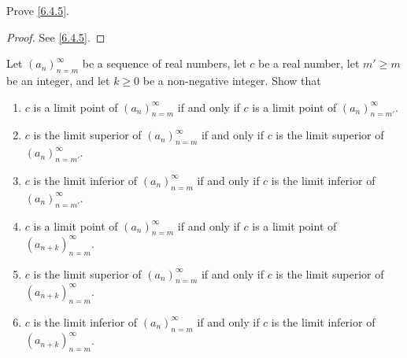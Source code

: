 \exercisesection

\begin{ex}\label{ex:6.4.1}
  Prove \cref{6.4.5}.
\end{ex}

\begin{proof}
  See \cref{6.4.5}.
\end{proof}

\begin{ex}\label{ex:6.4.2}
  Let \((a_n)_{n = m}^\infty\) be a sequence of real numbers, let \(c\) be a real number, let \(m' \geq m\) be an integer, and let \(k \geq 0\) be a non-negative integer.
  Show that
  \begin{enumerate}
    \item \(c\) is a limit point of \((a_n)_{n = m}^\infty\) if and only if \(c\) is a limit point of \((a_n)_{n = m'}^\infty\).
    \item \(c\) is the limit superior of \((a_n)_{n = m}^\infty\) if and only if \(c\) is the limit superior of \((a_n)_{n = m'}^\infty\).
    \item \(c\) is the limit inferior of \((a_n)_{n = m}^\infty\) if and only if \(c\) is the limit inferior of \((a_n)_{n = m'}^\infty\).
    \item \(c\) is a limit point of \((a_n)_{n = m}^\infty\) if and only if \(c\) is a limit point of \((a_{n + k})_{n = m}^\infty\).
    \item \(c\) is the limit superior of \((a_n)_{n = m}^\infty\) if and only if \(c\) is the limit superior of \((a_{n + k})_{n = m}^\infty\).
    \item \(c\) is the limit inferior of \((a_n)_{n = m}^\infty\) if and only if \(c\) is the limit inferior of \((a_{n + k})_{n = m}^\infty\).
  \end{enumerate}
\end{ex}

